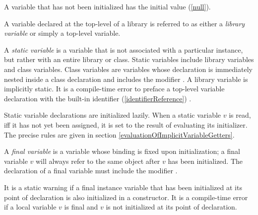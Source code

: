 \documentclass{article}
\begin{document}
\LMHash{}
A variable that has not been initialized has the initial value \NULL{} (\ref{null}).

\LMHash{}
A variable declared at the top-level of a library is referred to as either a {\em library variable} or simply a top-level variable. 

\LMHash{}
A {\em static variable} is a variable that is not associated with a particular instance, but rather with an entire library or class.  Static variables include library variables and class variables. Class variables are variables whose declaration is immediately nested inside a class declaration and includes the modifier \STATIC{}. A library variable is implicitly static. It is a compile-time error to preface a top-level variable declaration with the built-in identifier  (\ref{identifierReference}) \STATIC{}.  

\LMHash{}
Static variable declarations are initialized lazily. When a static variable $v$ is read, iff it has not yet been assigned,  it is set to the result of evaluating its initializer. The precise rules are given in section \ref{evaluationOfImplicitVariableGetters}. 


\LMHash{}
A {\em final variable} is a variable whose binding is fixed upon initialization; a final variable $v$ will always refer to the same object after $v$ has been initialized. The declaration of a final variable must  include the modifier \FINAL{}. 

\LMHash{}
It is a static warning if a final instance variable that has been initialized at its point of declaration  is  also initialized in a constructor. 
It is a compile-time error if a local variable $v$ is final and $v$ is not initialized at its point of declaration.

\end{document}
